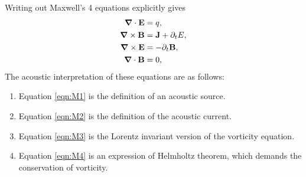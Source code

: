 \documentclass[10pt, fleqn,final,showtrims,oldfontcommands]{article} %
\newcommand{\sub}[1]{\begin{subequations}#1\end{subequations}}
\newcommand{\eqa}[1]{\begin{align}#1\end{align}}
\newcommand{\eqal}[2]{\begin{align}#1\label{eqn:#2}\end{align}}
\newcommand{\eqnref}[1]{\ref{eqn:#1}}
\newcommand{\lr}[1]{\left( #1 \right)}
\renewcommand{\d}{\partial}
\newcommand{\del}{\nabla}
\newcommand{\vdel}{ \mbox{\boldmath $\del$}}
\newcommand{\dt}{{\d_t}}
\newcommand{\vJ}{\vect J}
\newcommand{\vE}{\vect E}
\newcommand{\vB}{\vect B}
\newcommand{\g}{\gamma_0}
\newcommand{\vect}[1]{\mathbf{#1}}
\newcommand{\vA}{\textbf{A}}
\newcommand{\vv}{\textbf{v}}
\newcommand{\nlist}[1]
	   {  
	     \begin{enumerate}
	       #1
	     \end{enumerate} 
	   }
\begin{document}
Writing out Maxwell's 4 equations explicitly gives
\sub{
\eqa{
 \vdel \cdot \vE &= q,\label{eqn:M1}  \\ 
 \vdel \times \vB &= \vJ + \dt E, \label{eqn:M2}\\
 \vdel \times \vE &= -\dt\vB\label{eqn:M3},\\
 \vdel \cdot \vB &= 0\label{eqn:M4},
}
}
The acoustic interpretation of these equations are as follows:
\nlist{
\item Equation \eqnref{M1} is the definition of an acoustic source.
\item Equation \eqnref{M2} is the definition of the acoustic current.
\item Equation \eqnref{M3} is the Lorentz invariant version of the vorticity equation.
\item Equation \eqnref{M4} is an expression of Helmholtz theorem, which demands the conservation of vorticity.
}







\end{document}
